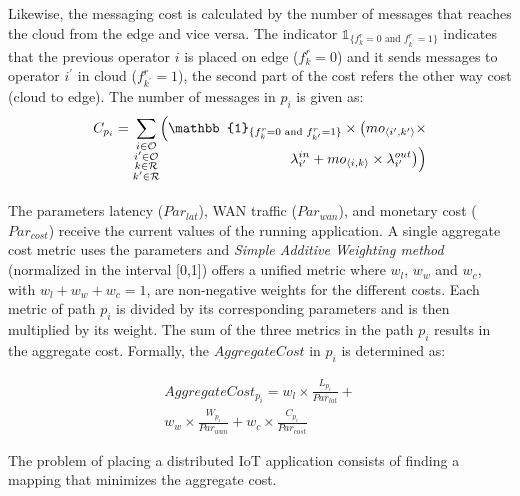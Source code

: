 Likewise, the messaging cost is calculated by the number of messages that reaches the cloud from the edge and vice versa. The indicator $\mathbb{1}_{ \{f_{k}^{r}=0\text{ and }f_{k^\prime}^{r} = 1\}}$ indicates that the previous operator $i$ is placed on edge ($f_{k}^r=0$) and it sends messages to operator $i^\prime$ in cloud ($f_{k^\prime}^{r} = 1$), the second part of the cost refers the other way cost (cloud to edge). The number of messages in $p_i$ is given as:
\begin{equation}
  \begin{split} 
    C_{p_i} = \smash{\sum_{\substack{i\in \mathcal{O} \\
                  i^\prime\in \mathcal{O} \\
                  k\in\mathcal{R} \\
                  k^\prime\in\mathcal{R}
                 }
          }      }
        \Big(\mathbb{1}_{ \{f_{k}^{r}=0\text{ and }f_{k^\prime}^{r} = 1\}}\times \big(mo_{\langle i^\prime,k^\prime\rangle} \times \\ \lambda_{i^\prime}^{in} + mo_{\langle i, k\rangle} \times\lambda_{i^\prime}^{out}\big) \Big)
  \end{split} 
  \label{eq:cost}
\end{equation}
\\

The parameters latency ($Par_{lat}$), WAN traffic ($Par_{wan}$), and monetary cost ($Par_{cost}$) receive the current values of the running application. A single aggregate cost metric uses the parameters and \textit{Simple Additive Weighting method} \cite{yoon:1995} (normalized in the interval [0,1]) offers a unified metric where $w_l$, $w_w$ and $w_c$, with $w_l + w_w + w_c = 1$, are non-negative weights for the different costs. Each metric of path $p_i$ is divided by its corresponding parameters and is then multiplied by its weight. The sum of the three metrics in the path $p_i$ results in the aggregate cost. Formally, the $AggregateCost$ in $p_i$ is determined as:


\begin{equation}
  \begin{split} 
    AggregateCost_{p_i} = w_l\times \frac{L_{p_i}}{Par_{lat}} + \\ w_w\times\frac{W_{p_i}}{Par_{wan}}+ w_c\times\frac{C_{p_i}}{Par_{cost}}
  \end{split}    
  \label{eq:placement}
\end{equation}

The problem of placing a distributed \ac{IoT} application consists of finding a mapping that minimizes the aggregate cost. %

